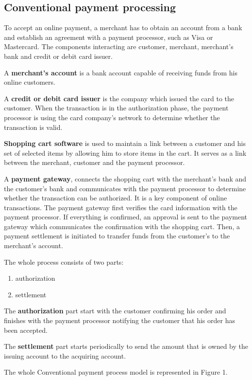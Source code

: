 \documentclass{ferseminar}
\begin{document}
\subsection{Conventional payment processing}
To accept an online payment, a merchant has to obtain an account from a bank and establish an agreement with a payment processor, such as Visa or Mastercard. The components interacting are customer, merchant, merchant's bank and credit or debit card issuer.

A \textbf{merchant's account} is a bank account capable of receiving funds from his online customers. 

A \textbf{credit or debit card issuer} is the company which issued the card to the customer. When the transaction is in the authorization phase, the payment processor is using the card company's network to determine whether the transaction is valid.

\textbf{Shopping cart software} is used to maintain a link between a customer and his set of selected items by allowing him to store items in the cart. It serves as a link between the merchant, customer and the payment processor.

A \textbf{payment gateway}, connects the shopping cart with the merchant's bank and the customer's bank and communicates with the payment processor to determine whether the transaction can be authorized. It is a key component of online transactions. The payment gateway first verifies the card information with the payment processor. If everything is confirmed, an approval is sent to the payment gateway which communicates the confirmation with the shopping cart. Then, a payment settlement is initiated to transfer funds from the customer's to the merchant's account. 

The whole process consists of two parts:
\begin{enumerate}
	\item authorization
	\item settlement
\end{enumerate}

The \textbf{authorization} part start with the customer confirming his order and finishes with the payment processor notifying the customer that his order has been accepted.

The \textbf{settlement} part starts periodically to send the amount that is owned by the issuing account to the acquiring account. 

The whole Conventional payment process model is represented in Figure 1.
\end{document}
